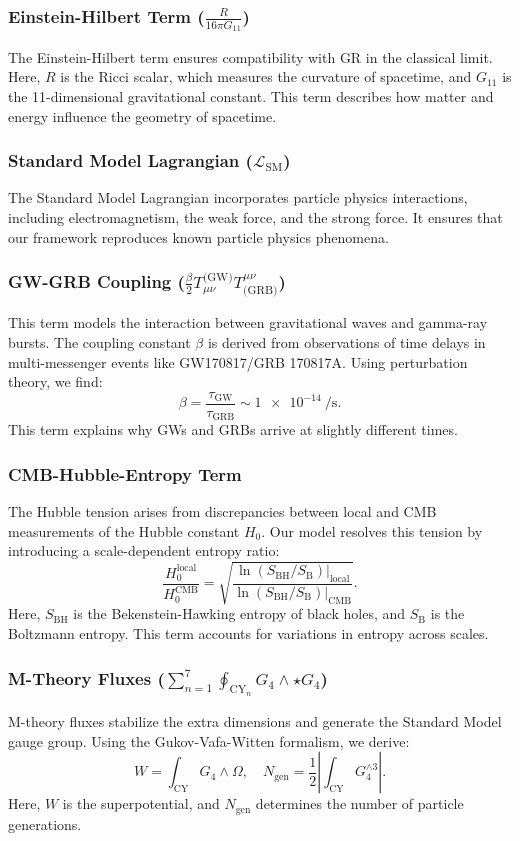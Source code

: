 \documentclass[12pt, a4paper]{article}
\begin{document}
\subsubsection{Einstein-Hilbert Term ($\frac{R}{16\pi G_{11}}$)}
The Einstein-Hilbert term ensures compatibility with GR in the classical limit. Here, $R$ is the Ricci scalar, which measures the curvature of spacetime, and $G_{11}$ is the 11-dimensional gravitational constant. This term describes how matter and energy influence the geometry of spacetime.

\subsubsection{Standard Model Lagrangian ($\mathcal{L}_{\text{SM}}$)}
The Standard Model Lagrangian incorporates particle physics interactions, including electromagnetism, the weak force, and the strong force. It ensures that our framework reproduces known particle physics phenomena.

\subsubsection{GW-GRB Coupling ($\frac{\beta}{2} T_{\mu\nu}^{\text{(GW)}} T^{\mu\nu}_{\text{(GRB)}}$)}
This term models the interaction between gravitational waves and gamma-ray bursts. The coupling constant $\beta$ is derived from observations of time delays in multi-messenger events like GW170817/GRB 170817A. Using perturbation theory, we find:
\[
\beta = \frac{\tau_{\text{GW}}}{\tau_{\text{GRB}}} \sim \SI{1e-14}{\per\second}.
\]
This term explains why GWs and GRBs arrive at slightly different times.

\subsubsection{CMB-Hubble-Entropy Term}
The Hubble tension arises from discrepancies between local and CMB measurements of the Hubble constant $H_0$. Our model resolves this tension by introducing a scale-dependent entropy ratio:
\[
\frac{H_0^{\text{local}}}{H_0^{\text{CMB}}} = \sqrt{\frac{\ln(S_{\text{BH}}/S_{\text{B}})|_{\text{local}}}{\ln(S_{\text{BH}}/S_{\text{B}})|_{\text{CMB}}}}.
\]
Here, $S_{\text{BH}}$ is the Bekenstein-Hawking entropy of black holes, and $S_{\text{B}}$ is the Boltzmann entropy. This term accounts for variations in entropy across scales.

\subsubsection{M-Theory Fluxes ($\sum_{n=1}^7 \oint_{\text{CY}_n} G_4 \wedge \star G_4$)}
M-theory fluxes stabilize the extra dimensions and generate the Standard Model gauge group. Using the Gukov-Vafa-Witten formalism, we derive:
\[
W = \int_{\text{CY}} G_4 \wedge \Omega,\quad N_{\text{gen}} = \frac{1}{2} \left| \int_{\text{CY}} G_4^{\wedge 3} \right|.
\]
Here, $W$ is the superpotential, and $N_{\text{gen}}$ determines the number of particle generations.
\end{document}
